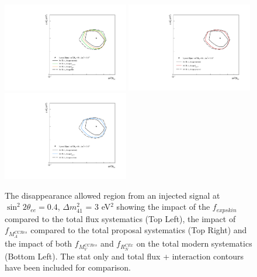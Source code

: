 \begin{figure}[h!]
  {\includegraphics[width=0.49\textwidth]{figures-chap6/allowed_regions/single_param/nue_disapp_flux.pdf}}
  {\includegraphics[width=0.49\textwidth]{figures-chap6/allowed_regions/single_param/nue_disapp_proposal.pdf}}
  {\includegraphics[width=0.49\textwidth]{figures-chap6/allowed_regions/single_param/nue_disapp_modern.pdf}}
  \captionsetup{width=0.49\textwidth}
  \parbox[b]{0.49\textwidth}%
  {
  \caption[The \nue disappearance allowed regions with the inclusion of single systematic parameters compared to the region with the inclusion of all parameters in the associated set.]{The \nue disappearance allowed region from an injected signal at $\sin^2{2\theta_{ee}} = 0.4$, $\Delta m^2_{41}$ = 3 eV$^2$ showing the impact of the $f_{expskin}$ compared to the total flux systematics (Top Left), the impact of $f_{M_A^{CCRes}}$ compared to the total proposal systematics (Top Right) and the impact of both $f_{M_V^{CCRes}}$ and $f_{R_N^{C Ex}}$ on the total modern systematics (Bottom Left). The stat only and total flux + interaction contours have been included for comparison. \\}
    \label{fig:nue_disapp_single_syst_sets} 
  }
\end{figure}
\clearpage

